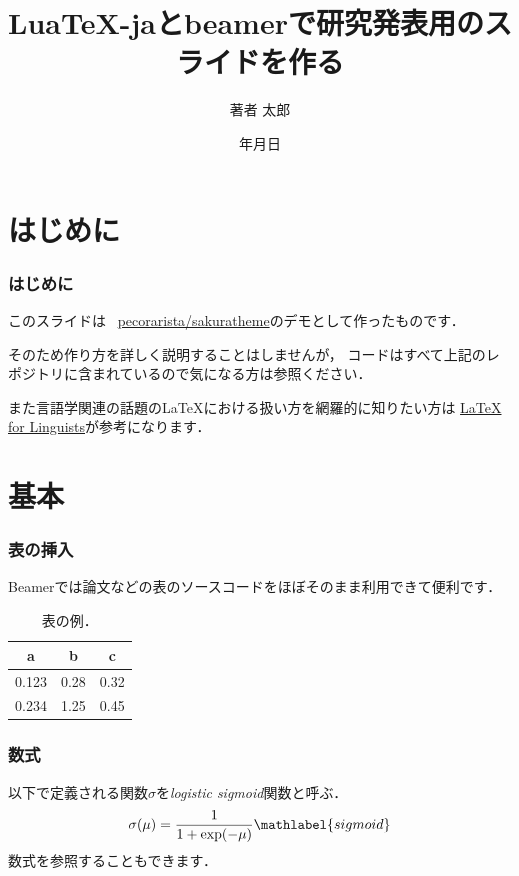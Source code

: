 \documentclass[%
    hyperref={colorlinks,linkcolor=sDarkBlue,urlcolor=sDarkBlue,citecolor=sDarkBlue}
]{beamer}
\title{Lua\TeX{}-jaとbeamerで研究発表用のスライドを作る}
\institute{所属}
\author{著者 太郎}
\date{{\number\year}年{\number\month}月{\number\day}日}
\DeclareMathOperator{\exponential}{exp}
\newcommand\header[1]{\multicolumn{1}{c}{\textbf{#1}}}
\begin{document}
    \maketitle

    \section{はじめに}
    \begin{frame}
        \frametitle{はじめに}
        このスライドは \faGithub\ \href{https://github.com/pecorarista/sakuratheme}{\ttfamily pecorarista/sakuratheme}のデモとして作ったものです．

        \bigskip

        そのため作り方を詳しく説明することはしませんが，
        コードはすべて上記のレポジトリに含まれているので気になる方は参照ください．
        \bigskip

        また言語学関連の話題の\LaTeX における扱い方を網羅的に知りたい方は
        \href{https://www1.essex.ac.uk/linguistics/external/clmt/latex4ling/}
        {LaTeX for Linguists}が参考になります．
    \end{frame}

    \section{基本}
    \begin{frame}
        \frametitle{表の挿入}
        Beamerでは論文などの表のソースコードをほぼそのまま利用できて便利です．
        \begin{table}
            \caption{表の例．}
            \begin{tabular}{rrr}
                \toprule
                \header{a} & \header{b} & \header{c} \\
                \midrule
                0.123 & 0.28  & 0.32 \\
                0.234 & 1.25  & 0.45 \\
                \bottomrule
            \end{tabular}
        \end{table}
    \end{frame}

    \begin{frame}
        \frametitle{数式}
        以下で定義される関数$\sigma$を\emph{logistic sigmoid}関数と呼ぶ\citep{prml}．
        \begin{align}
            \sigma(\mu) = \frac{1}{1 + \exponential(-\mu)} \mathlabel{sigmoid}
        \end{align}
        数式を参照することもできます．
    \end{frame}
\end{document}
